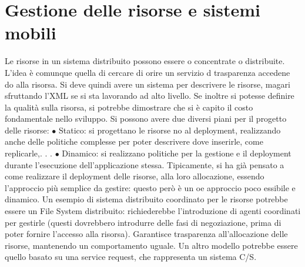 \section{Gestione delle risorse e sistemi mobili}
Le risorse in un sistema distribuito possono essere o concentrate o distribuite.
L'idea è comunque quella di cercare di orire un servizio d trasparenza accedene
do alla risorsa.
Si deve quindi avere un sistema per descrivere le risorse, magari sfruttando
l'XML se si sta lavorando ad alto livello. Se inoltre si potesse definire la qualità
sulla risorsa, si potrebbe dimostrare che si è capito il costo fondamentale nello
sviluppo.
Si possono avere due diversi piani per il progetto delle risorse:
$\bullet$ Statico: si progettano le risorse no al deployment, realizzando anche delle
politiche complesse per poter descrivere dove inserirle, come replicarle,. . .
$\bullet$ Dinamico: si realizzano politiche per la gestione e il deployment durante
l'esecuzione dell'applicazione stessa.
Tipicamente, si ha già pensato a come realizzare il deployment delle risorse, alla
loro allocazione, essendo l'approccio più semplice da gestire: questo però è un
oe
approccio poco essibile e dinamico.
Un esempio di sistema distribuito coordinato per le risorse potrebbe essere
un File System distribuito: richiederebbe l'introduzione di agenti coordinati per
gestirle (questi dovrebbero introdurre delle fasi di negoziazione, prima di poter
fornire l'accesso alla risorsa). Garantisce trasparenza all'allocazione delle risorse,
mantenendo un comportamento uguale. Un altro modello potrebbe essere quello
basato su una service request, che rappresenta un sistema C/S.
